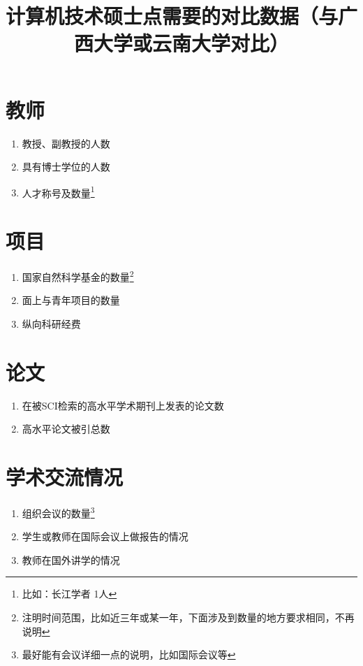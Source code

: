 \documentclass{article}
\begin{document}
\title{计算机技术硕士点需要的对比数据（与广西大学或云南大学对比）}
\maketitle
\section{教师}
\begin{enumerate}
\item
教授、副教授的人数
\item
具有博士学位的人数
\item
人才称号及数量\footnote{比如：长江学者 1人}
\end{enumerate}
\section{项目}
\begin{enumerate}
\item
国家自然科学基金的数量\footnote{注明时间范围，比如近三年或某一年，下面涉及到数量的地方要求相同，不再说明}
\item
面上与青年项目的数量
\item
纵向科研经费
\end{enumerate}
\section{论文}
\begin{enumerate}
\item
在被SCI检索的高水平学术期刊上发表的论文数
\item
高水平论文被引总数
\end{enumerate}
\section{学术交流情况}
\begin{enumerate}
\item
组织会议的数量\footnote{最好能有会议详细一点的说明，比如国际会议等}
\item
学生或教师在国际会议上做报告的情况
\item
教师在国外讲学的情况
\end{enumerate}
\end{document}
